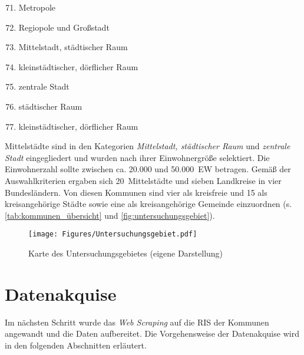 \begin{multicols}{2}
    \begin{enumerate}[label=\arabic*]
        \setcounter{enumi}{70}
        \item Metropole
        \item Regiopole und Großstadt
        \item Mittelstadt, städtischer Raum
        \item kleinstädtischer, dörflicher Raum
        \item zentrale Stadt 
        \item städtischer Raum
        \item kleinstädtischer, dörflicher Raum
    \end{enumerate}
\end{multicols}

Mittelstädte sind in den Kategorien \textit{Mittelstadt, städtischer Raum} und \textit{zentrale Stadt} eingegliedert und wurden nach ihrer Einwohnergröße selektiert. Die Einwohnerzahl sollte zwischen ca. 20.000 und 50.000~EW betragen. Gemäß der Auswahlkriterien ergaben sich 20~Mittelstädte und sieben Landkreise in vier Bundesländern. Von diesen Kommunen sind vier als kreisfreie und 15 als kreisangehörige Städte sowie eine als kreisangehörige Gemeinde einzuordnen (s. \autoref{tab:kommunen_übersicht} und \autoref{fig:untersuchungsgebiet}). 

\begingroup
    \vfill
    
    \vfill
\endgroup
  
\begin{figure}[h!]
     \centering
     \texttt{[image: Figures/Untersuchungsgebiet.pdf]}
     \caption[Karte des Untersuchungsgebietes]{Karte des Untersuchungsgebietes (eigene Darstellung)}
     \label{fig:untersuchungsgebiet}
\end{figure}

\newpage

\section{Datenakquise}

Im nächsten Schritt wurde das \textit{Web Scraping} auf die RIS der Kommunen angewandt und die Daten aufbereitet. Die Vorgehensweise der Datenakquise wird in den folgenden Abschnitten erläutert.

